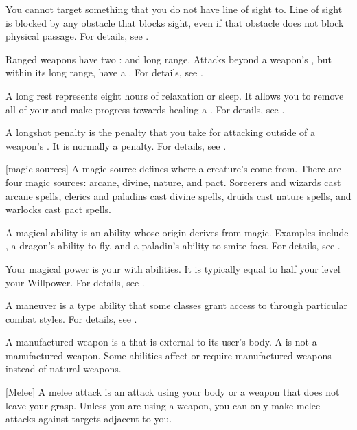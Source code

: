  You cannot target something that you do not have line of sight to.
Line of sight is blocked by any obstacle that blocks sight, even if that obstacle does not block physical passage.
For details, see .

 Ranged weapons have two :  and long range.
Attacks beyond a weapon's , but within its long range, have a  .
For details, see .

 A long rest represents eight hours of relaxation or sleep.
It allows you to remove all of your  and make progress towards healing a .
For details, see .

 A longshot penalty is the penalty that you take for attacking outside of a weapon's .
It is normally a   penalty.
For details, see .

[magic sources] A magic source defines where a creature's  come from.
There are four magic sources: arcane, divine, nature, and pact.
Sorcerers and wizards cast arcane spells, clerics and paladins cast divine spells, druids cast nature spells, and warlocks cast pact spells.

 A magical ability is an ability whose origin derives from magic.
Examples include , a dragon's ability to fly, and a paladin's ability to smite foes.
For details, see .

 Your magical power is your  with \magical abilities.
It is typically equal to half your level \add your Willpower.
For details, see .

 A maneuver is a type  ability that some classes grant access to through particular combat styles.
For details, see .

 A manufactured weapon is a  that is external to its user's body.
A  is not a manufactured weapon.
Some abilities affect or require manufactured weapons instead of natural weapons.

[Melee] A melee attack is an attack using your body or a weapon that does not leave your grasp.
Unless you are using a  weapon, you can only make melee attacks against targets adjacent to you.

